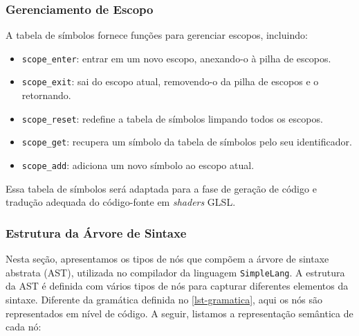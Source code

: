 \subsubsection{Gerenciamento de Escopo}

A tabela de símbolos fornece funções para gerenciar escopos, incluindo:
\begin{itemize}
    \item \texttt{scope\_enter}: entrar em um novo escopo, anexando-o à pilha de escopos.
    \item \texttt{scope\_exit}: sai do escopo atual, removendo-o da pilha de escopos e o retornando.
    \item \texttt{scope\_reset}: redefine a tabela de símbolos limpando todos os escopos.
    \item \texttt{scope\_get}: recupera um símbolo da tabela de símbolos pelo seu identificador.
    \item \texttt{scope\_add}: adiciona um novo símbolo ao escopo atual.
\end{itemize}




Essa tabela de símbolos será adaptada para a fase de geração de código e tradução adequada do código-fonte em \textit{shaders} GLSL.




\subsubsection{Estrutura da Árvore de Sintaxe}
Nesta seção, apresentamos os tipos de nós que compõem a árvore de sintaxe abstrata (AST), utilizada no compilador da linguagem \texttt{SimpleLang}. A estrutura da AST é definida com vários tipos de nós para capturar diferentes elementos da sintaxe. Diferente da gramática definida no \autoref{lst-gramatica}, aqui os nós são representados em nível de código. A seguir, listamos a representação semântica de cada nó:



